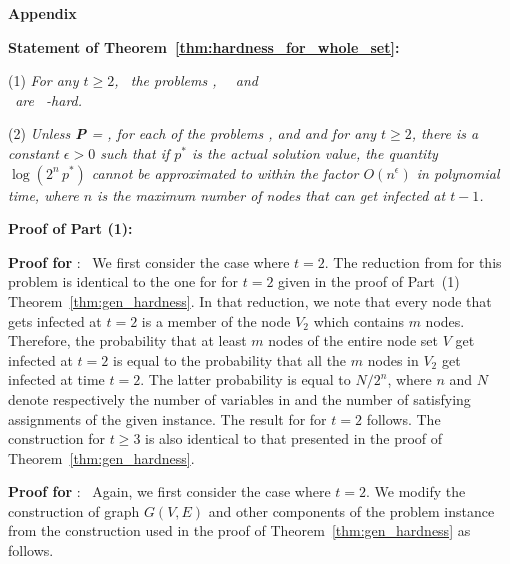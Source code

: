 \begin{center}
\Large{\textbf{Appendix}}
\end{center}

\noindent
\textbf{Statement of Theorem~\ref{thm:hardness_for_whole_set}:}~
\begin{description}
\item{(1)}
\emph{
For any $t \geq 2$,~ the problems \tNewInfv,~ \tTotInfv{} ~and \\
\tTotVulv{} ~are~ \cnump-hard.
}

\item{(2)}
\emph{
Unless \textbf{P} = \cnp,
for each of the problems \tNewInfv, \tTotInfv{} and
\tTotVulv{} and for any $t \geq 2$,
there is a constant $\epsilon > 0$
such that if $p^*$ is the actual solution value,
the quantity $\log{(2^n\,p^*)}$ cannot be approximated to within the factor
$O(n^{\epsilon})$ in polynomial time, where $n$
is the maximum number of nodes that can get infected at $t-1$.
}
\end{description}

\medskip

\noindent
\textbf{Proof of Part (1):}~ 

\medskip
\noindent
\textbf{Proof for} \tNewInfv:~ 
We first consider the case where $t = 2$.
The reduction from \mtsat{} for this problem is identical to the one for
\tNewInfs{} for $t = 2$ given in the proof of 
Part~(1) Theorem~\ref{thm:gen_hardness}.
In that reduction, we note that every node that gets infected at $t = 2$
is a member of the node $V_2$ which contains $m$ nodes.
Therefore, the probability that at least $m$ nodes of the entire
node set $V$ get infected at $t = 2$ is equal to the probability that
all the $m$ nodes in $V_2$ get infected at time $t = 2$.
The latter probability is equal to $N/2^n$, where $n$ and $N$ denote 
respectively the number of variables in and the number of satisfying
assignments of the given \mtsat{} instance.
The result for \tNewInfv{} for $t = 2$ follows.
The construction for $t \geq 3$ is also identical to that presented
in the proof of Theorem~\ref{thm:gen_hardness}.  

\medskip
\noindent
\textbf{Proof for} \tTotInfv:~
Again, we first consider the case where $t = 2$.
We modify the construction of graph $G(V,E)$ 
and other components of the problem instance from the construction
used in the proof of Theorem~\ref{thm:gen_hardness} as follows.

